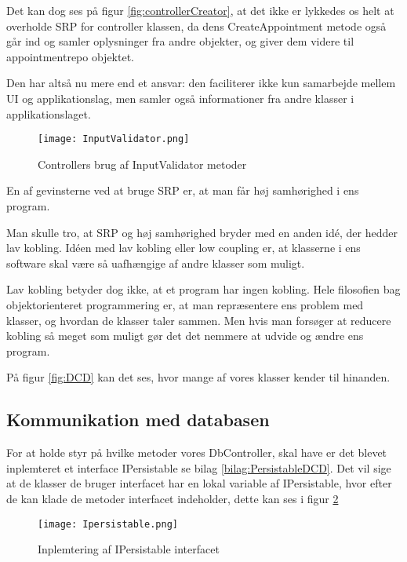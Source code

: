 Det kan dog ses på figur \ref{fig:controllerCreator}, at det ikke er lykkedes os helt at overholde SRP for controller klassen, da dens CreateAppointment metode også går ind og samler oplysninger fra andre objekter, og giver dem videre til appointmentrepo objektet.

Den har altså nu mere end et ansvar: den faciliterer ikke kun samarbejde mellem UI og applikationslag, men samler også informationer fra andre klasser i applikationslaget.

\begin{figure}[h]
    \caption{Controllers brug af InputValidator metoder}
    \centering
        \texttt{[image: InputValidator.png]}
    \label{fig:InputValidator}
\end{figure}

En af gevinsterne ved at bruge SRP er, at man får høj samhørighed i ens program.

Man skulle tro, at SRP og høj samhørighed bryder med en anden idé, der hedder lav kobling.     
Idéen med lav kobling eller low coupling er, at klasserne i ens software skal være så uafhængige af andre klasser som muligt.

Lav kobling betyder dog ikke, at et program har ingen kobling.
Hele filosofien bag objektorienteret programmering er, at man repræsentere ens problem med klasser, og hvordan de klasser taler sammen.
Men hvis man forsøger at reducere kobling så meget som muligt gør det det nemmere at udvide og ændre ens program.

På figur \ref{fig:DCD} kan det ses, hvor mange af vores klasser kender til hinanden.

\subsection{Kommunikation med databasen}

For at holde styr på hvilke metoder vores DbController, skal have er det blevet inplemteret et interface IPersistable se bilag \ref{bilag:PersistableDCD}.
Det vil sige at de klasser de bruger interfacet har en lokal variable af IPersistable, hvor efter de kan klade de metoder interfacet indeholder, dette kan ses i figur \ref{fig:Persistable}

\begin{figure}[h]
    \caption{Inplemtering af IPersistable interfacet}
    \centering
        \texttt{[image: Ipersistable.png]}
    \label{fig:Persistable}
\end{figure}

